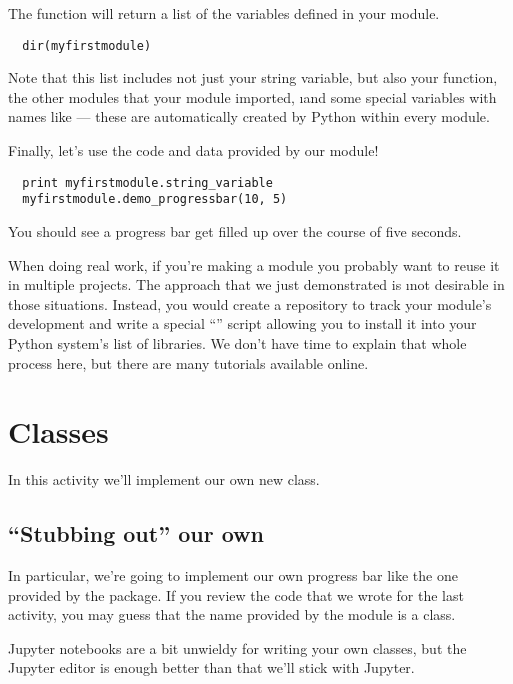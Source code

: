 \documentclass[letterpaper, 12pt, titlepage, twoside]{article}
\begin{document}
The  function will return a list of the variables defined in your
module.

\begin{lstlisting}
  dir(myfirstmodule)
\end{lstlisting}

Note that this list includes not just your string variable, but also your
function, the other modules that your module imported, \i{and} some special
variables with names like  --- these are automatically
created by Python within every module.

Finally, let's use the code and data provided by our module!

\begin{lstlisting}
  print myfirstmodule.string_variable
  myfirstmodule.demo_progressbar(10, 5)
\end{lstlisting}

You should see a progress bar get filled up over the course of five seconds.

When doing real work, if you're making a module you probably want to reuse it
in multiple projects. The approach that we just demonstrated is \i{not}
desirable in those situations. Instead, you would create a  repository
to track your module's development and write a special ``'' script
allowing you to install it into your Python system's list of libraries. We
don't have time to explain that whole process here, but there are many
tutorials available online.


\newpage
\section{Classes}

In this activity we'll implement our own new class.

\subsection*{``Stubbing out'' our own }

In particular, we're going to implement our own progress bar like the one
provided by the  package. If you review the code that we wrote
for the last activity, you may guess that the  name provided by
the  module is a class.

Jupyter notebooks are a bit unwieldy for writing your own classes, but the
Jupyter editor is enough better than  that we'll stick with Jupyter.
\end{document}
